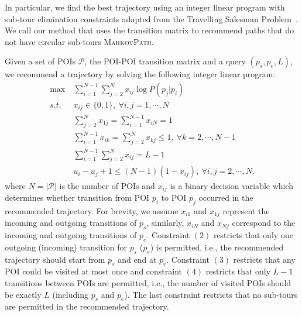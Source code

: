 In particular, we find the best trajectory using an integer linear program with
sub-tour elimination constraints adapted from the Travelling Salesman Problem~\cite{opt98}.
We call our method that uses the transition matrix to recommend paths
that do not have circular sub-tours \textsc{MarkovPath}.

Given a set of POIs $\mathcal{P}$, the POI-POI transition matrix and a query $(p_s, p_e, L)$,
we recommend a trajectory by solving the following integer linear program:
\begin{align}
\max ~& \sum_{i=1}^{N-1} \sum_{j=2}^N x_{ij} \log P(p_j | p_i) \nonumber \\
s.t. ~& x_{ij} \in \{0, 1\}, ~\forall i, j = 1, \cdots, N \\
     & \sum_{j=2}^N x_{1j} = \sum_{i=1}^{N-1} x_{iN} = 1 \\
     & \sum_{i=1}^{N-1} x_{ik} = \sum_{j=2}^N x_{kj} \le 1, ~\forall k=2, \cdots, N-1 \\
     & \sum_{i=1}^{N-1} \sum_{j=2}^N x_{ij} = L-1 \\
     & u_i - u_j + 1 \le (N-1) (1-x_{ij}), ~\forall i, j = 2, \cdots, N.
\end{align}
where $N=|\mathcal{P}|$ is the number of POIs and $x_{ij}$ is a binary decision variable 
which determines whether transition from POI $p_i$ to POI $p_j$ occurred in the recommended trajectory.
For brevity, we assume $x_{i1}$ and $x_{1j}$ represent the incoming and outgoing transitions of $p_s$,
similarly, $x_{iN}$ and $x_{Nj}$ correspond to the incoming and outgoing transitions of $p_e$.
Constraint $(2)$ restricts that only one outgoing (incoming) transition for $p_s$ ($p_e$)
is permitted, i.e., the recommended trajectory should start from $p_s$ and end at $p_e$.
Constraint $(3)$ restricts that any POI could be visited at most once and constraint $(4)$
restricts that only $L-1$ transitions between POIs are permitted, i.e., the number of visited POIs should be
exactly $L$ (including $p_s$ and $p_e$).
The last constraint restricts that no sub-tours are permitted in the recommended trajectory.
